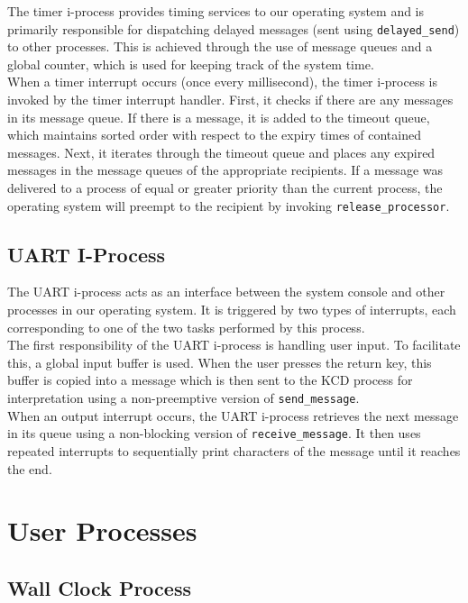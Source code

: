 \documentclass[12pt]{report}
\begin{document}
The timer i-process provides timing services to our operating system and is primarily responsible for dispatching delayed messages (sent using \texttt{delayed_send}) to other processes. This is achieved through the use of message queues and a global counter, which is used for keeping track of the system time.\\

When a timer interrupt occurs (once every millisecond), the timer i-process is invoked by the timer interrupt handler. First, it checks if there are any messages in its message queue. If there is a message, it is added to the timeout queue, which maintains sorted order with respect to the expiry times of contained messages. Next, it iterates through the timeout queue and places any expired messages in the message queues of the appropriate recipients. If a message was delivered to a process of equal or greater priority than the current process, the operating system will preempt to the recipient by invoking \texttt{release_processor}.

\subsection{UART I-Process}
\label{subsec:UART I-Process}

The UART i-process acts as an interface between the system console and other processes in our operating system. It is triggered by two types of interrupts, each corresponding to one of the two tasks performed by this process.\\

The first responsibility of the UART i-process is handling user input. To facilitate this, a global input buffer is used. When the user presses the return key, this buffer is copied into a message which is then sent to the KCD process for interpretation using a non-preemptive version of \texttt{send_message}.\\

When an output interrupt occurs, the UART i-process retrieves the next message in its queue using a non-blocking version of \texttt{receive_message}. It then uses repeated interrupts to sequentially print characters of the message until it reaches the end.

\section{User Processes}

\subsection{Wall Clock Process}
\end{document}
